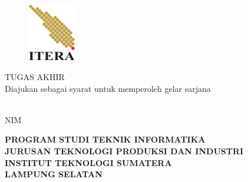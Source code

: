 \clearpage
\pagestyle{empty}
% 

\begin{center}
\smallskip

    \begin{figure}[h]
    	\centering
    	\includegraphics[width=2.1cm, height=2.5cm, keepaspectratio]{resources/itera-logo}
    \end{figure}

	\large \bfseries \MakeUppercase{\thetitle}
	\vfill

    \large \uppercase{Tugas Akhir}\\
    {\normalsize \normalfont Diajukan sebagai syarat untuk memperoleh gelar sarjana}
    \vfill

    \normalsize \normalfont \theauthor\\
    NIM \printnim
    \vfill

    \normalsize \bfseries
    \uppercase{
        Program Studi Teknik Informatika \\
        Jurusan Teknologi Produksi dan Industri\\
        Institut Teknologi Sumatera\\
        Lampung Selatan
    }\medskip

    \thedate

\end{center}

\clearpage
